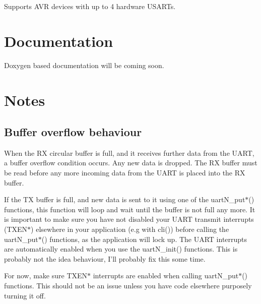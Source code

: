 Supports A\-V\-R devices with up to 4 hardware U\-S\-A\-R\-Ts.

\section*{Documentation}

Doxygen based documentation will be coming soon.

\section*{Notes}

\subsection*{Buffer overflow behaviour}

When the R\-X circular buffer is full, and it receives further data from the U\-A\-R\-T, a buffer overflow condition occurs. Any new data is dropped. The R\-X buffer must be read before any more incoming data from the U\-A\-R\-T is placed into the R\-X buffer.

If the T\-X buffer is full, and new data is sent to it using one of the {\ttfamily uart\-N\-\_\-put$\ast$()} functions, this function will loop and wait until the buffer is not full any more. It is important to make sure you have not disabled your U\-A\-R\-T transmit interrupts ({\ttfamily T\-X\-E\-N$\ast$}) elsewhere in your application (e.\-g with {\ttfamily cli()}) before calling the {\ttfamily uart\-N\-\_\-put$\ast$()} functions, as the application will lock up. The U\-A\-R\-T interrupts are automatically enabled when you use the {\ttfamily uart\-N\-\_\-init()} functions. This is probably not the idea behaviour, I'll probably fix this some time.

For now, make sure {\ttfamily T\-X\-E\-N$\ast$} interrupts are enabled when calling {\ttfamily uart\-N\-\_\-put$\ast$()} functions. This should not be an issue unless you have code elsewhere purposely turning it off. 